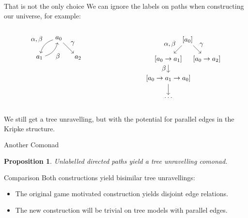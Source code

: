 \documentclass{beamer}
\newtheorem{proposition}{Proposition}
\begin{document}
\begin{frame}{That is not the only choice}
We can ignore the labels on paths when constructing our universe, for example:
\begin{columns}
\begin{column}{0.5\textwidth}
\begin{equation*}
    \begin{tikzpicture}
    \path node(a0) {$a_0$} +(-1,-1) node (a1) {$a_1$} +(1,-1) node(a2) {$a_2$};
    \path[->] 
    (a0) edge[bend right] node[midway, above left]{$\alpha, \beta$} (a1)
    (a1) edge[bend right] node[midway, below right]{$\beta$} (a0)
    (a0) edge node[midway, above right]{$\gamma$} (a2);
    \end{tikzpicture}
\end{equation*}
\end{column}
\begin{column}{0.5\textwidth}
\begin{equation*}
    \begin{tikzpicture}
    \path 
    node (a) {$[a_0]$} +(-1,-1) 
    node (b) {$[a_0 \rightarrow a_1]$} ++(1,-1)
    node (c) {$[a_0 \rightarrow a_2]$} (b) ++(0,-1)
    node (a') {$[a_0 \rightarrow a_1 \rightarrow a_0]$} ++(0,-1)
    node (dots) {$\ldots$};
    \path[->]
    (a) edge node[midway, above left]{$\alpha, \beta$} (b)
    (a) edge node[midway, above right]{$\gamma$} (c)
    (b) edge node[midway, left]{$\beta$} (a')
    (a') edge (dots);
    \end{tikzpicture}
\end{equation*}
\end{column}
\end{columns}
We still get a tree unravelling, but with the potential for parallel edges in the Kripke structure.
\end{frame}

\begin{frame}{Another Comonad}

    \begin{proposition}
    Unlabelled directed paths yield a tree unravelling comonad.
    \end{proposition}

    \begin{block}{Comparison}
    Both constructions yield bisimilar tree unravellings:
    \begin{itemize}
        \item The original game motivated construction yields disjoint edge relations.
        \item The new construction will be trivial on tree models with parallel edges.
    \end{itemize}
    \end{block}
\end{frame}
\end{document}
